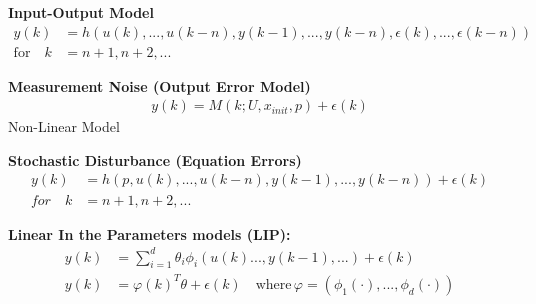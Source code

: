 \begin{tcolorbox}[colback=green!5!white,colframe=green!75!black,title=\textbf{Discrete Time Systems}]
	\textbf{Input-Output Model}
	\begin{align*}
	y(k) &= h(u(k), ..., u(k-n), y(k-1), ..., y(k-n), \epsilon(k), ..., \epsilon(k-n))\\
	\text{for} \quad k &= n + 1, n + 2, ...
	\end{align*}
	
	
	\textbf{Measurement Noise (Output Error Model)}
	\begin{align*}
	y(k) = M(k; U, x_{init}, p) + \epsilon(k)
	\end{align*}
	Non-Linear Model
	
	
	\textbf{Stochastic Disturbance (Equation Errors)}
	\begin{align*}
	y(k) &= h(p, u(k), ..., u(k-n), y(k-1), ..., y(k-n)) + \epsilon(k)\\
	for \quad k& = n + 1, n + 2, ...
	\end{align*}
	
	\textbf{Linear In the Parameters models (LIP):}
	\begin{align*}
	y(k) &= \sum_{ i = 1}^{d}\theta_i\phi_i(u(k)...,y(k-1),...)+\epsilon(k)\\
	y(k) &= \varphi(k)^T\theta + \epsilon(k) \quad \text{where} \, \varphi = (\phi_1(\cdot),... ,\phi_d(\cdot)) 
	\end{align*}
\end{tcolorbox}
